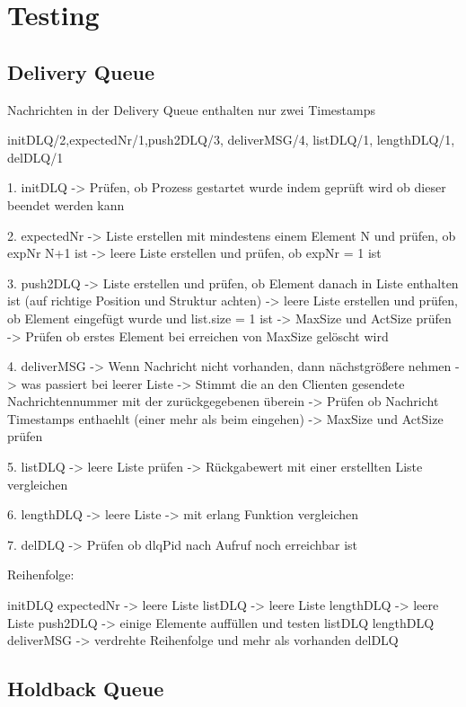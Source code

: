 \section{Testing}

\subsection{Delivery Queue}

Nachrichten in der Delivery Queue enthalten nur zwei Timestamps 

initDLQ/2,expectedNr/1,push2DLQ/3, deliverMSG/4, listDLQ/1, lengthDLQ/1, delDLQ/1

1. initDLQ
-> Prüfen, ob Prozess gestartet wurde indem geprüft wird ob dieser beendet werden kann

2. expectedNr
-> Liste erstellen mit mindestens einem Element N und prüfen, ob expNr N+1 ist
-> leere Liste erstellen und prüfen, ob expNr = 1 ist

3. push2DLQ
-> Liste erstellen und prüfen, ob Element danach in Liste enthalten ist (auf richtige Position und Struktur achten)
-> leere Liste erstellen und prüfen, ob Element eingefügt wurde und list.size = 1 ist 
-> MaxSize und ActSize prüfen
-> Prüfen ob erstes Element bei erreichen von MaxSize gelöscht wird 

4. deliverMSG
-> Wenn Nachricht nicht vorhanden, dann nächstgrößere nehmen
-> was passiert bei leerer Liste 
-> Stimmt die an den Clienten gesendete Nachrichtennummer mit der zurückgegebenen überein
-> Prüfen ob Nachricht Timestamps enthaehlt (einer mehr als beim eingehen)
-> MaxSize und ActSize prüfen

5. listDLQ
-> leere Liste prüfen 
-> Rückgabewert mit einer erstellten Liste vergleichen 

6. lengthDLQ
-> leere Liste 
-> mit erlang Funktion vergleichen 

7. delDLQ
-> Prüfen ob dlqPid nach Aufruf noch erreichbar ist 

Reihenfolge:

initDLQ
expectedNr -> leere Liste 
listDLQ -> leere Liste
lengthDLQ -> leere Liste
push2DLQ -> einige Elemente auffüllen und testen 
listDLQ 
lengthDLQ
deliverMSG -> verdrehte Reihenfolge und mehr als vorhanden
delDLQ

\subsection{Holdback Queue}